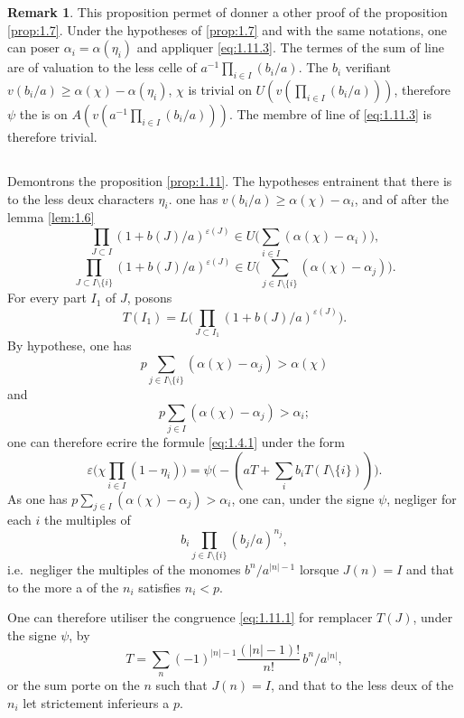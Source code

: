 \documentclass[12pt,a4paper]{article}
\theoremstyle{plain}
\theoremstyle{definition}
\newtheorem{remark}[theorem]{Remark}
\theoremstyle{remark}
\begin{document}
\begin{remark}
This proposition permet of donner a other proof of the proposition \ref{prop:1.7}. Under the hypotheses of \ref{prop:1.7} and with the same notations, one can poser $\alpha_i = \alpha(\eta_i)$ and appliquer \eqref{eq:1.11.3}. The termes of the sum of line are of valuation to the less celle of $a^{-1} \prod_{i \in I}(b_i/a)$. The $b_i$ verifiant $v(b_i/a) \geq \alpha(\chi) - \alpha(\eta_i)$, $\chi$ is trivial on $U(v(\prod_{i \in I}(b_i/a)))$, therefore $\psi$ the is on $A(v(a^{-1}\prod_{i \in I}(b_i/a)))$. The membre of line of \eqref{eq:1.11.3} is therefore trivial.
\end{remark}

\subsection{}
\label{sec:1.12}

Demontrons the proposition \ref{prop:1.11}. The hypotheses entrainent that there is to the less deux characters $\eta_i$. one has $v(b_i/a) \geq \alpha(\chi) - \alpha_i$, and of after the lemma \ref{lem:1.6}
\[
\prod_{J \subset I}(1+b(J)/a)^{\varepsilon(J)} \in U\biggl(\sum_{i \in I}(\alpha(\chi) - \alpha_i)\biggr),
\]
\[
\prod_{J \subset I \setminus \{i\}}(1+b(J)/a)^{\varepsilon(J)} \in U\biggl(\sum_{j \in I \setminus \{i\}}(\alpha(\chi) - \alpha_j)\biggr).
\]
For every part $I_1$ of $J$, posons
\[
T(I_1) = L\biggl(\prod_{J \subset I_1}(1+b(J)/a)^{\varepsilon(J)}\biggr).
\]
By hypothese, one has
\[
p \sum_{j \in I \setminus \{i\}}(\alpha(\chi) - \alpha_j) > \alpha(\chi)
\]
and
\[
p \sum_{j \in I}(\alpha(\chi) - \alpha_j) > \alpha_i;
\]
one can therefore ecrire the formule \eqref{eq:1.4.1} under the form
\[
\varepsilon\biggl(\chi \prod_{i \in I}(1-\eta_i)\biggr) = \psi\bigl(-(aT + \sum_i b_i T(I \setminus \{i\}))\bigr).
\]
As one has $p \sum_{j \in I}(\alpha(\chi) - \alpha_j) > \alpha_i$, one can, under the signe $\psi$, negliger for each $i$ the multiples of
\[
b_i \prod_{j \in I \setminus \{i\}}(b_j/a)^{n_j},
\]
i.e.~negliger the multiples of the monomes $b^n/a^{|n|-1}$ lorsque $J(n) = I$ and that to the more a of the $n_i$ satisfies $n_i < p$.

One can therefore utiliser the congruence \eqref{eq:1.11.1} for remplacer $T(J)$, under the signe $\psi$, by
\[
T = \sum_n (-1)^{|n|-1} \frac{(|n|-1)!}{n!} \, b^n/a^{|n|},
\]
or the sum porte on the $n$ such that $J(n) = I$, and that to the less deux of the $n_i$ let strictement inferieurs a $p$.
\end{document}
